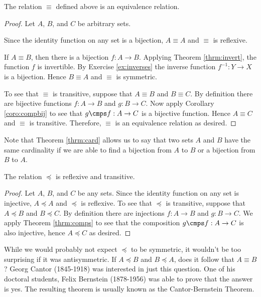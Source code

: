 \begin{thrm}\label{thrm:card}
The relation $\equiv$ defined above is an equivalence relation.
\end{thrm}

\begin{proof}
Let $A$, $B$, and $C$ be arbitrary sets.

Since the identity function on any set is a bijection, $A\equiv A$ and $\equiv$ is reflexive.

If $A\equiv B$, then there is a bijection $f:A\to B$.  Applying Theorem \ref{thrm:invert}, the function $f$ is invertible.  By Exercise \ref{ex:inverses} the inverse function $f^{-1}:Y\to X$ is a bijection. Hence $B\equiv A$ and $\equiv$ is symmetric.

To see that $\equiv$ is transitive, suppose that $A\equiv B$ and $B\equiv C$. By definition there are bijective functions $f:A\to B$ and $g:B\to C$. Now apply Corollary \ref{coro:compbij} to see that $g\cmps f:A\to C$ is a bijective function.  Hence $A\equiv C$ and $\equiv$ is transitive. Therefore, $\equiv$ is an equivalence relation as desired.
\end{proof}

Note that Theorem \ref{thrm:card} allows us to say that two sets $A$ and $B$ have the same cardinality if we are able to find a bijection from $A$ to $B$ or a bijection from $B$ to $A$.

\begin{thrm}\label{thrm:ordering}
The relation $\preceq$ is reflexive and transitive.
\end{thrm}

\begin{proof}
Let $A$, $B$, and $C$ be any sets.  Since the identity function on any set is injective, $A\preceq A$ and $\preceq$ is reflexive.  To see that $\preceq$ is transitive, suppose that $A\preceq B$ and $B\preceq C$.  By definition there are injections $f:A\to B$ and $g:B\to C$.  We apply Theorem \ref{thrm:comps} to see that the composition $g\cmps f:A\to C$ is also injective, hence $A\preceq C$ as desired.
\end{proof}

While we would probably not expect $\preceq$ to be symmetric, it wouldn't be too surprising if it was antisymmetric.  If $A\preceq B$ and $B\preceq A$, does it follow that $A\equiv B$?  Georg Cantor (1845-1918) was interested in just this question.  One of his doctoral students, Felix Bernstein (1878-1956) was able to prove that the answer is yes. The resulting theorem is usually known as the Cantor-Bernstein Theorem.

